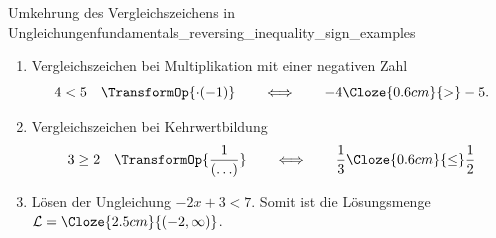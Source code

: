 \begin{ExampleBox}{Umkehrung des Vergleichszeichens in Ungleichungen}{fundamentals_reversing_inequality_sign_examples}
    \begin{enumerate}[label=(\alph*)]
      \item Vergleichszeichen bei Multiplikation mit einer negativen Zahl
        \[
          \displaystyle 4<5 \quad\TransformOp{\cdot(-1)}
          \qquad \Longleftrightarrow \qquad
          -4\Cloze{0.6cm}{>}-5.
        \]
      \item Vergleichszeichen bei Kehrwertbildung
        \[
          3\geq2 \quad\TransformOp{\frac{1}{\left(\ldots\right)}}
          \qquad \Longleftrightarrow \qquad
          \frac{1}{3}\Cloze{0.6cm}{\leq}\frac{1}{2}
        \]

      \item Lösen der Ungleichung $-2x+3<7$.
        Somit ist die Lösungsmenge
        $\mathcal{L}=\Cloze{2.5cm}{(-2,\infty)}$.
    \end{enumerate}
\end{ExampleBox}
